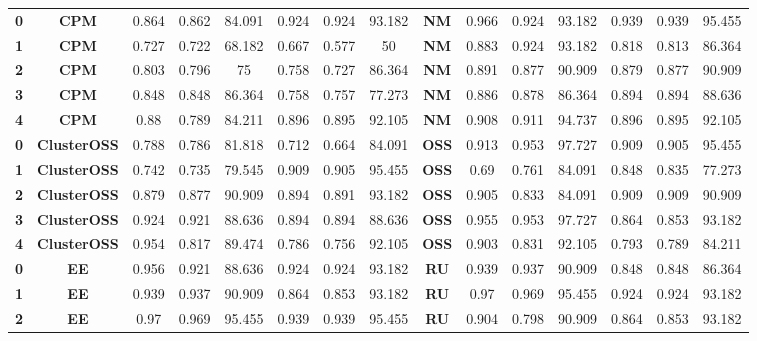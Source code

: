 {{\begin{tabular}{c|c|cccccc|ccccccc}
\textbf{0} & \textbf{CPM} & 0.864 & 0.862 & 84.091 & 0.924 & 0.924 & 93.182 & \multicolumn{1}{c|}{\textbf{NM}} & 0.966 & 0.924 & 93.182 & 0.939 & 0.939 & 95.455 \\
\textbf{1} & \textbf{CPM} & 0.727 & 0.722 & 68.182 & 0.667 & 0.577 & 50    & \multicolumn{1}{c|}{\textbf{NM}} & 0.883 & 0.924 & 93.182 & 0.818 & 0.813 & 86.364 \\
\textbf{2} & \textbf{CPM} & 0.803 & 0.796 & 75    & 0.758 & 0.727 & 86.364 & \multicolumn{1}{c|}{\textbf{NM}} & 0.891 & 0.877 & 90.909 & 0.879 & 0.877 & 90.909 \\
\textbf{3} & \textbf{CPM} & 0.848 & 0.848 & 86.364 & 0.758 & 0.757 & 77.273 & \multicolumn{1}{c|}{\textbf{NM}} & 0.886 & 0.878 & 86.364 & 0.894 & 0.894 & 88.636 \\
\textbf{4} & \textbf{CPM} & 0.88  & 0.789 & 84.211 & 0.896 & 0.895 & 92.105 & \multicolumn{1}{c|}{\textbf{NM}} & 0.908 & 0.911 & 94.737 & 0.896 & 0.895 & 92.105 \\
\textbf{0} & \textbf{ClusterOSS} & 0.788 & 0.786 & 81.818 & 0.712 & 0.664 & 84.091 & \multicolumn{1}{c|}{\textbf{OSS}} & 0.913 & 0.953 & 97.727 & 0.909 & 0.905 & 95.455 \\
\textbf{1} & \textbf{ClusterOSS} & 0.742 & 0.735 & 79.545 & 0.909 & 0.905 & 95.455 & \multicolumn{1}{c|}{\textbf{OSS}} & 0.69  & 0.761 & 84.091 & 0.848 & 0.835 & 77.273 \\
\textbf{2} & \textbf{ClusterOSS} & 0.879 & 0.877 & 90.909 & 0.894 & 0.891 & 93.182 & \multicolumn{1}{c|}{\textbf{OSS}} & 0.905 & 0.833 & 84.091 & 0.909 & 0.909 & 90.909 \\
\textbf{3} & \textbf{ClusterOSS} & 0.924 & 0.921 & 88.636 & 0.894 & 0.894 & 88.636 & \multicolumn{1}{c|}{\textbf{OSS}} & 0.955 & 0.953 & 97.727 & 0.864 & 0.853 & 93.182 \\
\textbf{4} & \textbf{ClusterOSS} & 0.954 & 0.817 & 89.474 & 0.786 & 0.756 & 92.105 & \multicolumn{1}{c|}{\textbf{OSS}} & 0.903 & 0.831 & 92.105 & 0.793 & 0.789 & 84.211 \\
\textbf{0} & \textbf{EE} & 0.956 & 0.921 & 88.636 & 0.924 & 0.924 & 93.182 & \multicolumn{1}{c|}{\textbf{RU}} & 0.939 & 0.937 & 90.909 & 0.848 & 0.848 & 86.364 \\
\textbf{1} & \textbf{EE} & 0.939 & 0.937 & 90.909 & 0.864 & 0.853 & 93.182 & \multicolumn{1}{c|}{\textbf{RU}} & 0.97  & 0.969 & 95.455 & 0.924 & 0.924 & 93.182 \\
\textbf{2} & \textbf{EE} & 0.97  & 0.969 & 95.455 & 0.939 & 0.939 & 95.455 & \multicolumn{1}{c|}{\textbf{RU}} & 0.904 & 0.798 & 90.909 & 0.864 & 0.853 & 93.182 \\

\end{tabular}}}
